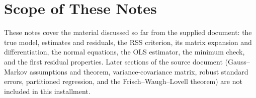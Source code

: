 \documentclass[11pt]{article}
\begin{document}
\section*{Scope of These Notes}
These notes cover the material discussed so far from the supplied document: the true model, estimates and residuals, the RSS criterion, its matrix expansion and differentiation, the normal equations, the OLS estimator, the minimum check, and the first residual properties. Later sections of the source document (Gauss--Markov assumptions and theorem, variance-covariance matrix, robust standard errors, partitioned regression, and the Frisch--Waugh--Lovell theorem) are not included in this installment.
\end{document}
